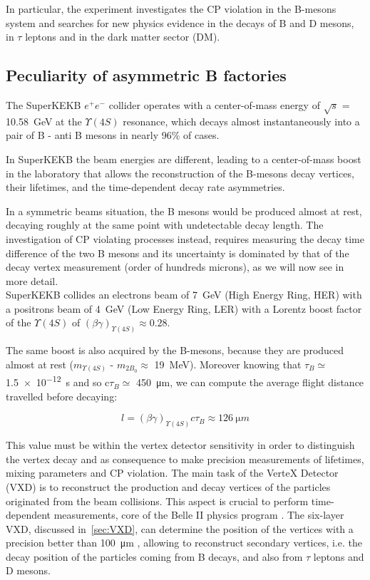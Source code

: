 In particular, the experiment investigates the CP violation in the B-mesons system and searches for new physics evidence in the decays of B and D mesons, in $\tau$ leptons and in the dark matter sector (DM).


\subsection{Peculiarity of asymmetric B factories} \label{sec:vertex_decay}

The SuperKEKB $e^{+}e^{-}$ collider operates with a center-of-mass energy of $\sqrt{s}$ = \SI{10.58}{GeV} at the $\Upsilon(4S)$ resonance, which decays almost instantaneously into a pair of B - anti B mesons in nearly 96\% of cases. 

In SuperKEKB the beam energies are different, leading to a center-of-mass boost in the laboratory that allows the reconstruction of the B-mesons decay vertices, their lifetimes, and the time-dependent decay rate asymmetries.

In a symmetric beams situation, the B mesons would be produced almost at rest, decaying roughly at the same point with undetectable decay length. 
The investigation of CP violating processes instead, requires measuring the decay time difference of the two B mesons and its uncertainty is dominated by that of the decay vertex measurement (order of hundreds microns), as we will now see in more detail.\\

SuperKEKB collides an electrons beam of \SI{7}{GeV} (High Energy Ring, HER) with a positrons beam of \SI{4}{GeV} (Low Energy Ring, LER) with a Lorentz boost factor of the $\Upsilon(4S)$ of $(\beta\gamma)_{\Upsilon(4S)}\approx0.28$.

The same boost is also acquired by the B-mesons, because they are produced almost at rest ($m_{\Upsilon(4S)}$ - $m_{2B_{0}}\approx$ \SI{19}{MeV}). Moreover knowing that $\tau_{B}\simeq $\SI{1.5e-12}{s} and so c$\tau_{B}\simeq$ \SI{450}{\micro m}, we can compute the average flight distance travelled before decaying:

\begin{equation}
\textit{l} = (\beta\gamma)_{\Upsilon(4S)}c\tau_{B} \approx \SI{126}{\micro m}  
\end{equation} 

This value must be within the vertex detector sensitivity in order to distinguish the vertex decay and as consequence to make precision measurements of lifetimes, mixing parameters and CP violation. The main task of the VerteX Detector (VXD) is to reconstruct the production and decay vertices of the particles originated from the beam collisions. This aspect is crucial to perform time-dependent measurements, core of the Belle II physics program \cite{physics_book}. The six-layer VXD, discussed in~\autoref{sec:VXD}, can determine the position of the vertices with a precision better than \SI{100}{\micro m} \cite{Belle-II:2010dht}, allowing to reconstruct secondary vertices, i.e. the decay position of the particles coming from B decays, and also from $\tau$ leptons and D mesons.

